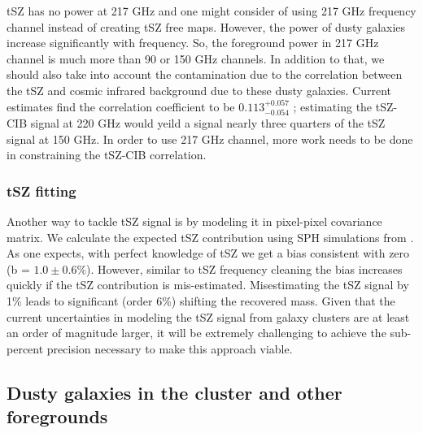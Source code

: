 tSZ has no power at 217 GHz and one might consider of using 217 GHz frequency channel instead of creating tSZ free maps. 
However, the power of dusty galaxies increase significantly with frequency.
So, the foreground power in 217 GHz channel is much more than 90 or 150 GHz channels. 
In addition to that, we should also take into account the contamination due to the correlation between the tSZ and cosmic infrared background due to these dusty galaxies.
 Current estimates find the correlation coefficient to be $0.113^{+0.057}_{-0.054}$ \citep{george15}; estimating the tSZ-CIB signal at 220 GHz would yeild a signal nearly three quarters of the tSZ signal at 150 GHz. 
 In order to use 217 GHz channel, more work needs to be done in constraining the tSZ-CIB correlation.
 
 \subsubsection{tSZ fitting}
 Another way to tackle tSZ signal is by modeling it in pixel-pixel covariance matrix.
 We calculate the expected tSZ contribution using SPH simulations from \citet{mccarthy13}.
As one expects, with perfect knowledge of tSZ we get a bias consistent with zero (b = $1.0 \pm 0.6\%$).
However, similar to tSZ frequency cleaning the bias increases quickly if the tSZ contribution is mis-estimated.
Misestimating the tSZ signal by 1\% leads to significant (order 6\%) shifting the recovered mass.
Given that the current uncertainties in modeling the tSZ signal from galaxy clusters are at least an order of magnitude larger, it will be extremely challenging to achieve the sub-percent precision necessary to make this approach viable.
 
 
 
 \subsection{Dusty galaxies in the cluster and other foregrounds}
\label{sec_DG_sys_bias}


